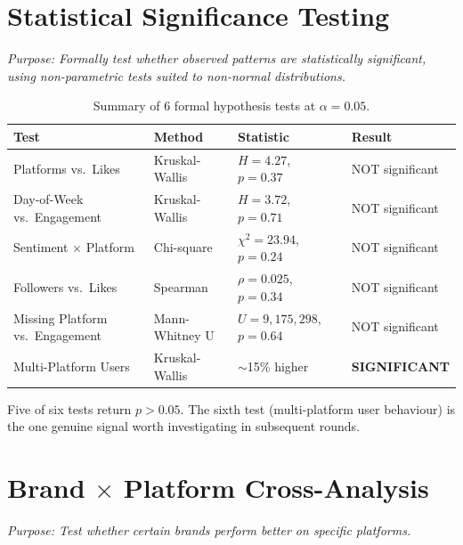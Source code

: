 \documentclass[11pt,a4paper]{article}
\begin{document}
\section{Statistical Significance Testing}

\textit{Purpose: Formally test whether observed patterns are statistically significant, using non-parametric tests suited to non-normal distributions.}

\begin{table}[H]
\centering
\small
\begin{tabular}{@{}llll@{}}
\toprule
\textbf{Test} & \textbf{Method} & \textbf{Statistic} & \textbf{Result} \\
\midrule
Platforms vs.\ Likes & Kruskal-Wallis & $H=4.27$, $p=0.37$ & NOT significant \\
Day-of-Week vs.\ Engagement & Kruskal-Wallis & $H=3.72$, $p=0.71$ & NOT significant \\
Sentiment $\times$ Platform & Chi-square & $\chi^2=23.94$, $p=0.24$ & NOT significant \\
Followers vs.\ Likes & Spearman & $\rho=0.025$, $p=0.34$ & NOT significant \\
Missing Platform vs.\ Engagement & Mann-Whitney U & $U=9{,}175{,}298$, $p=0.64$ & NOT significant \\
Multi-Platform Users & Kruskal-Wallis & $\sim$15\% higher & \textbf{SIGNIFICANT} \\
\bottomrule
\end{tabular}
\caption{Summary of 6 formal hypothesis tests at $\alpha=0.05$.}
\end{table}

\begin{insightbox}
Five of six tests return $p > 0.05$. The sixth test (multi-platform user behaviour) is the one genuine signal worth investigating in subsequent rounds.
\end{insightbox}

\section{Brand $\times$ Platform Cross-Analysis}

\textit{Purpose: Test whether certain brands perform better on specific platforms.}
\end{document}
